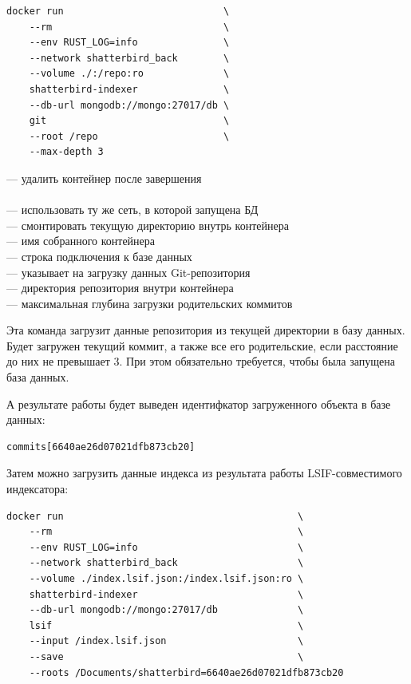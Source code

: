 \noindent\begin{minipage}[t]{0.45\textwidth}
\begin{lstlisting}
docker run                            \
    --rm                              \
    --env RUST_LOG=info               \
    --network shatterbird_back        \
    --volume ./:/repo:ro              \
    shatterbird-indexer               \
    --db-url mongodb://mongo:27017/db \
    git                               \
    --root /repo                      \
    --max-depth 3
\end{lstlisting}
\end{minipage}\hfil\begin{minipage}[t]{0.50\textwidth}\footnotesize\setlength{\baselineskip}{14.7pt}
\vspace{16pt}
— удалить контейнер после завершения \\
\\
— использовать ту же сеть, в которой запущена БД \\
— смонтировать текущую директорию внутрь контейнера \\
— имя собранного контейнера \\
— строка подключения к базе данных \\
— указывает на загрузку данных Git-репозитория \\
— директория репозитория внутри контейнера \\
— максимальная глубина загрузки родительских коммитов
\end{minipage}

Эта команда загрузит данные репозитория из текущей директории в базу данных. Будет загружен текущий коммит, а также все его родительские, если расстояние до них не превышает 3. При этом обязательно требуется, чтобы была запущена база данных.

А результате работы будет выведен идентифкатор загруженного объекта в базе данных:
\begin{lstlisting}
commits[6640ae26d07021dfb873cb20]
\end{lstlisting}

Затем можно загрузить данные индекса из результата работы LSIF-совместимого индексатора:
\begin{lstlisting}
docker run                                         \
    --rm                                           \
    --env RUST_LOG=info                            \
    --network shatterbird_back                     \
    --volume ./index.lsif.json:/index.lsif.json:ro \
    shatterbird-indexer                            \
    --db-url mongodb://mongo:27017/db              \
    lsif                                           \
    --input /index.lsif.json                       \
    --save                                         \
    --roots /Documents/shatterbird=6640ae26d07021dfb873cb20
\end{lstlisting}

